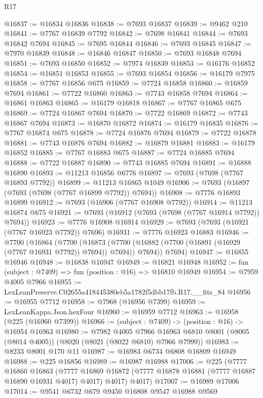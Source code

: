 \begin{lexlean}{R17}
\begin{coremodule}
@16837 := @16834 @16836
@16838 := @7693 @16837
@16839 := @9462 @210
@16841 := @7767 @16839 @7792
@16842 := @7698 @16841
@16844 := @7693 @16842 @7694
@16845 := @7695 @16844
@16846 := @7693 @16845
@16847 := @7970 @16839
@16848 := @16846 @16847
@16850 := @7693 @16848 @7694
@16851 := @7693 @16850
@16852 := @7974 @16839
@16853 := @16176 @16852
@16854 := @16851 @16853
@16855 := @7693 @16854
@16856 := @16179 @7975
@16858 := @7767 @16856 @675
@16859 := @7724 @16858
@16860 := @16859 @7694
@16861 := @7722 @16860
@16863 := @7743 @16858 @7694
@16864 := @16861 @16863
@16865 := @16179 @16818
@16867 := @7767 @16865 @675
@16869 := @7724 @16867 @7694
@16870 := @7722 @16869
@16872 := @7743 @16867 @7694
@16873 := @16870 @16872
@16874 := @16179 @16835
@16876 := @7767 @16874 @675
@16878 := @7724 @16876 @7694
@16879 := @7722 @16878
@16881 := @7743 @16876 @7694
@16882 := @16879 @16881
@16883 := @16179 @16852
@16885 := @7767 @16883 @675
@16887 := @7724 @16885 @7694
@16888 := @7722 @16887
@16890 := @7743 @16885 @7694
@16891 := @16888 @16890
@16893 := @11213 @16856 @6776
@16897 := @7693 (@7698 (@7767 @16893 @7792))
@16899 := @11213 @16865 @1049
@16906 := @7693 (@16897 (@7693 (@7698 (@7767 @16899 @7792)) @7694))
@16908 := @7776 @16893 @16899
@16912 := @7693 (@16906 (@7767 @16908 @7792))
@16914 := @11213 @16874 @675
@16921 := @7693 (@16912 (@7693 (@7698 (@7767 @16914 @7792)) @7694))
@16923 := @7776 @16908 @16914
@16929 := @7693 (@7693 (@16921 (@7767 @16923 @7792)) @7696)
@16931 := @7776 @16923 @16883
@16946 := @7700
    (@16864
      (@7700
        (@16873 (@7700 (@16882 (@7700 (@16891 (@16929 (@7767 @16931 @7792)) @7694)) @7694)) @7694))
      @7694)
@16947 := @16855 @16946
@16948 := @16838 @16947
@16949 := @16821 @16948
@16952 := fun (subject : @7409) => fun (position : @16) => @16810 @16949
@16954 := @7959 @4005 @7966
@16955 := LexLeanPreserve.C02655a418445380eb5a1782f5dbb17fb.R17.__fits_84
@16956 := @16955 @7712
@16958 := @7968 (@16956 @7399)
@16959 := LexLeanKappa.Json.hexFour
@16960 := @16959 @7712
@16963 := @16958 (@225 (@16960 @7399))
@16966 := (subject : @7409) -> (position : @16) -> @16954 @16963
@16980 := @7982
    @4005
    @7966
    @16963
    @6810
    @8001
    (@8005 (@8014 @4005))
    (@8020 (@8021 (@8022 @6810) @7966 @7999))
@16983 := @8233 @8001 @170 @11
@16987 := @16983 @6734 @6808 @16809 @16949
@16988 := @225 @16856
@16989 := @16987 @16988
@17006 := @225
    (@7777
      @16860
      @16863
      (@7777 @16869 @16872 (@7777 @16878 @16881 (@7777 @16887 @16890 @16931 @4017) @4017) @4017)
      @4017)
@17007 := @16989 @17006
@17014 := @9541 @6732 @679 @9450 @16808 @9547 @16988 @9569

\end{coremodule}
\end{lexlean}
